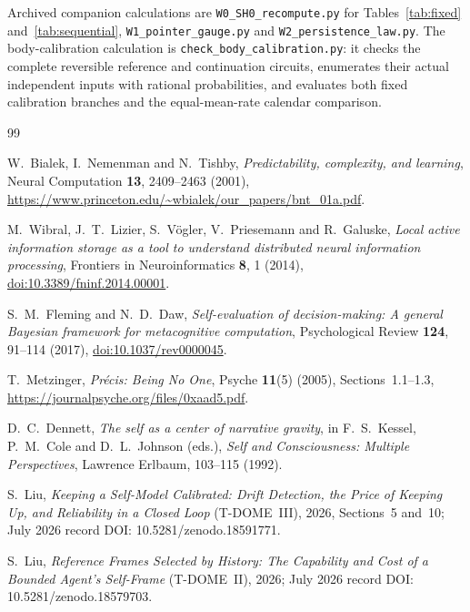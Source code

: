 \documentclass[11pt,a4paper]{article}
\begin{document}
{\raggedright Archived companion calculations are \texttt{W0\_SH0\_recompute.py} for Tables~\ref{tab:fixed} and~\ref{tab:sequential}, \texttt{W1\_pointer\_gauge.py} and \texttt{W2\_persistence\_law.py}. The body-calibration calculation is \texttt{check\_body\_calibration.py}: it checks the complete reversible reference and continuation circuits, enumerates their actual independent inputs with rational probabilities, and evaluates both fixed calibration branches and the equal-mean-rate calendar comparison.\par}

\begin{thebibliography}{99}
\raggedright
{}
W.~Bialek, I.~Nemenman and N.~Tishby,
\emph{Predictability, complexity, and learning},
Neural Computation \textbf{13}, 2409--2463 (2001),
\url{https://www.princeton.edu/~wbialek/our_papers/bnt_01a.pdf}.

M.~Wibral, J.~T.~Lizier, S.~V\"ogler, V.~Priesemann and R.~Galuske,
\emph{Local active information storage as a tool to understand distributed neural information processing},
Frontiers in Neuroinformatics \textbf{8}, 1 (2014),
\href{https://doi.org/10.3389/fninf.2014.00001}{doi:10.3389/fninf.2014.00001}.

S.~M.~Fleming and N.~D.~Daw,
\emph{Self-evaluation of decision-making: A general Bayesian framework for metacognitive computation},
Psychological Review \textbf{124}, 91--114 (2017),
\href{https://doi.org/10.1037/rev0000045}{doi:10.1037/rev0000045}.

T.~Metzinger, \emph{Pr\'ecis: Being No One},
Psyche \textbf{11}(5) (2005), Sections~1.1--1.3,
\url{https://journalpsyche.org/files/0xaad5.pdf}.

D.~C.~Dennett, \emph{The self as a center of narrative gravity},
in F.~S.~Kessel, P.~M.~Cole and D.~L.~Johnson (eds.),
\emph{Self and Consciousness: Multiple Perspectives},
Lawrence Erlbaum, 103--115 (1992).

S.~Liu, \emph{Keeping a Self-Model Calibrated: Drift Detection, the Price of Keeping Up, and Reliability in a Closed Loop} (T-DOME~III), 2026, Sections~5 and~10; July 2026 record DOI: 10.5281/zenodo.18591771.

S.~Liu, \emph{Reference Frames Selected by History: The Capability and Cost of a Bounded Agent's Self-Frame} (T-DOME~II), 2026; July 2026 record DOI: 10.5281/zenodo.18579703.


\end{thebibliography}
\end{document}
